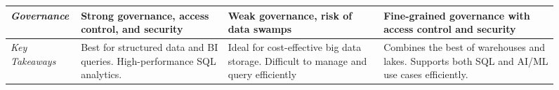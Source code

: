 \begin{figure}
\begin{minipage}[b]{\textwidth}
\begin{tabular}{|p{2.2cm}|p{3cm}|p{2.9cm}|p{3cm}|}
            \hline
            \textit{Governance} & Strong governance, access control, and security & Weak governance, risk of data swamps & Fine-grained governance with access control and security \\
            \hline
            \textit{Key Takeaways} & Best for structured data and BI queries. High-performance \gls{SQL} analytics. & Ideal for cost-effective big data storage. Difficult to manage and query efficiently & Combines the best of warehouses and lakes. Supports both \gls{SQL} and \gls{AI}/\gls{ML} use cases efficiently. \\
            \hline
        \end{tabular}
    \end{minipage}
\end{figure}



